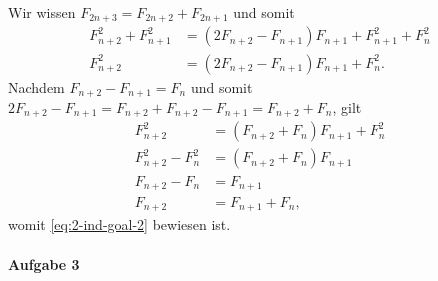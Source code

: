 \documentclass{article}
\begin{document}
Wir wissen $F_{2n + 3} = F_{2n + 2} + F_{2n + 1}$ und somit
\begin{align*}
    F^{2}_{n + 2} + F^{2}_{n + 1} &= (2F_{n + 2} - F_{n + 1})F_{n + 1} + F^{2}_{n + 1} + F^{2}_{n} \\
    F^{2}_{n + 2} &= (2F_{n + 2} - F_{n + 1})F_{n + 1} + F^{2}_{n}.
\end{align*}
Nachdem $F_{n + 2} - F_{n + 1} = F_{n}$ und somit $2F_{n + 2} - F_{n + 1} = F_{n + 2} + F_{n + 2} - F_{n + 1} = F_{n + 2} + F_{n}$, gilt
\begin{align*}
    F^{2}_{n + 2} &= (F_{n + 2} + F_{n})F_{n + 1} + F^{2}_{n} \\
    F^{2}_{n + 2} - F^{2}_{n} &= (F_{n + 2} + F_{n})F_{n + 1} \\
    F_{n + 2} - F_{n} &= F_{n + 1} \\
    F_{n + 2} &= F_{n + 1} + F_{n},
\end{align*}
womit \eqref{eq:2-ind-goal-2} bewiesen ist.

\paragraph{Aufgabe 3}
\end{document}
